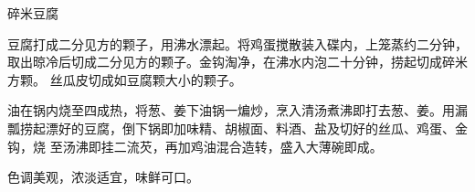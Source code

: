 %
%
%
%
%
%
%
\begin{recipe}{碎米豆腐}

\ingredients


\preparation

\step 豆腐打成二分见方的颗子，用沸水漂起。将鸡蛋搅散装入碟内，上笼蒸约二分钟，
取出晾冷后切成二分见方的颗子。金钩淘净，在沸水内泡二十分钟，捞起切成碎米方颗。
丝瓜皮切成如豆腐颗大小的颗子。

\step 油在锅内烧至四成热，将葱、姜下油锅一煸炒，烹入清汤煮沸即打去葱、姜。用漏
瓢捞起漂好的豆腐，倒下锅即加味精、胡椒面、料酒、盐及切好的丝瓜、鸡蛋、金钩，烧
至汤沸即挂二流芡，再加鸡油混合造转，盛入大薄碗即成。

\features

色调美观，浓淡适宜，味鲜可口。

\end{recipe}

